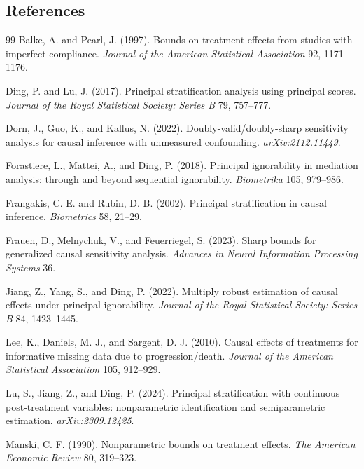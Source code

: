 \documentclass[11pt]{article}
\theoremstyle{definition}
\theoremstyle{plain}
\theoremstyle{remark}
\begin{document}
\subsection*{References}
\begin{thebibliography}{99}
Balke, A. and Pearl, J. (1997).
Bounds on treatment effects from studies with imperfect compliance.
\emph{Journal of the American Statistical Association} 92, 1171--1176.

Ding, P. and Lu, J. (2017).
Principal stratification analysis using principal scores.
\emph{Journal of the Royal Statistical Society: Series B} 79, 757--777.

Dorn, J., Guo, K., and Kallus, N. (2022).
Doubly-valid/doubly-sharp sensitivity analysis for causal inference with
unmeasured confounding.
\emph{arXiv:2112.11449}.

Forastiere, L., Mattei, A., and Ding, P. (2018).
Principal ignorability in mediation analysis: through and beyond sequential
ignorability.
\emph{Biometrika} 105, 979--986.

Frangakis, C. E. and Rubin, D. B. (2002).
Principal stratification in causal inference.
\emph{Biometrics} 58, 21--29.

Frauen, D., Melnychuk, V., and Feuerriegel, S. (2023).
Sharp bounds for generalized causal sensitivity analysis.
\emph{Advances in Neural Information Processing Systems} 36.

Jiang, Z., Yang, S., and Ding, P. (2022).
Multiply robust estimation of causal effects under principal ignorability.
\emph{Journal of the Royal Statistical Society: Series B} 84, 1423--1445.

Lee, K., Daniels, M. J., and Sargent, D. J. (2010).
Causal effects of treatments for informative missing data due to
progression/death.
\emph{Journal of the American Statistical Association} 105, 912--929.

Lu, S., Jiang, Z., and Ding, P. (2024).
Principal stratification with continuous post-treatment variables:
nonparametric identification and semiparametric estimation.
\emph{arXiv:2309.12425}.

Manski, C. F. (1990).
Nonparametric bounds on treatment effects.
\emph{The American Economic Review} 80, 319--323.


\end{thebibliography}
\end{document}
